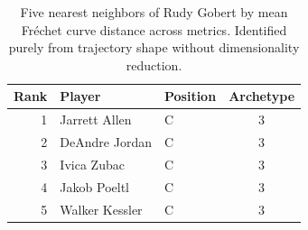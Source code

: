 \begin{table}[htbp]
  \centering\small
  \begin{tabular}{rllc}
    \toprule
    Rank & Player & Position & Archetype \\
    \midrule
    1 & Jarrett Allen & C & 3 \\
    2 & DeAndre Jordan & C & 3 \\
    3 & Ivica Zubac & C & 3 \\
    4 & Jakob Poeltl & C & 3 \\
    5 & Walker Kessler & C & 3 \\
    \bottomrule
  \end{tabular}
  \caption{Five nearest neighbors of Rudy Gobert by mean Fr\'{e}chet curve distance across metrics. Identified purely from trajectory shape without dimensionality reduction.}
  \label{tab:Rudy_Gobert_frechet_curve_neighbors}
\end{table}

